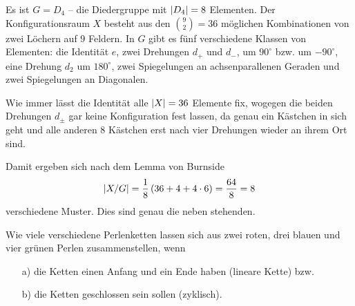 \documentclass[12pt,a4paper]{article}
\begin{document}
\begin{loesung} 
Es ist $G=D_4$ -- die Diedergruppe mit $\left\vert D_4\right\vert=8 $ Elementen.  Der
Konfigurationsraum $X$ besteht aus den $\binom{9}{2}= 36$ möglichen
Kombinationen von zwei Löchern auf $9$ Feldern.  In $G$ gibt es fünf
verschiedene Klassen von Elementen: die Identität $e$, zwei Drehungen $d_+$
und $d_-$, um $90^\circ $ bzw. um $-90^\circ$, eine Drehung $d_2$ um
$180^\circ$, zwei Spiegelungen an achsenparallenen Geraden und zwei
Spiegelungen an Diagonalen.

Wie immer lässt die Identität alle $\left\vert X\right\vert=36 $ Elemente fix, wogegen die
beiden Drehungen $d_\pm $ gar keine Konfiguration fest lassen, da genau ein
Kästchen in sich geht und alle anderen 8 Kästchen erst nach vier Drehungen
wieder an ihrem Ort sind.

\smallskip

\begin{minipage}{0.4\textwidth}
\end{minipage}
\quad
\begin{minipage}{0.55\textwidth}
\end{minipage}

\medskip

\begin{minipage}{0.55\textwidth}
Damit ergeben sich nach dem Lemma von Burnside
\begin{gather*}
  \left\vert X/G\right\vert= \frac{1}{8}\left(36 +4 +4\cdot 6\right) =\frac{64}{8}= 8
\end{gather*}
verschiedene Muster.  Dies sind genau die neben stehenden.
\end{minipage}
\quad 
\begin{minipage}{0.4\textwidth}
\end{minipage}
\end{loesung}

\begin{aufgabe}\label{a-kette1}
Wie viele verschiedene Perlenketten lassen sich aus zwei roten, 
drei blauen und vier grünen Perlen zusammenstellen, wenn
\begin{itemize}
\item [a)] die Ketten einen Anfang und ein Ende haben (lineare Kette) bzw.\
\item [b)] die Ketten geschlossen sein sollen (zyklisch). 
\end{itemize}
\end{aufgabe}
\end{document}
